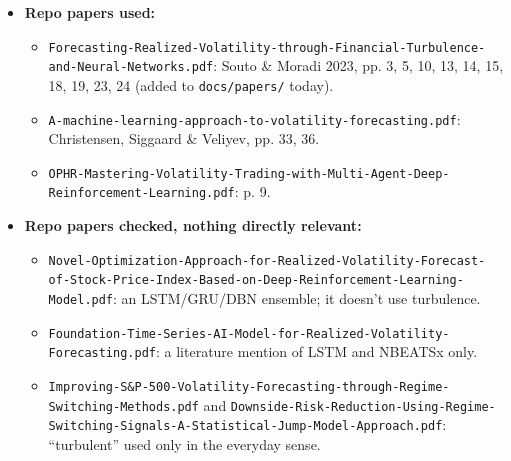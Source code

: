 \documentclass{article}
\begin{document}
\begin{itemize}

\item \textbf{Repo papers used:}

\begin{itemize}

\item \texttt{Forecasting-\allowbreak{}Realized-\allowbreak{}Volatility-\allowbreak{}through-\allowbreak{}Financial-\allowbreak{}Turbulence-\allowbreak{}and-\allowbreak{}Neural-\allowbreak{}Networks.\allowbreak{}pdf}: Souto \& Moradi 2023, pp. 3, 5, 10, 13, 14, 15, 18, 19, 23, 24 (added to \texttt{docs/\allowbreak{}papers/\allowbreak{}} today).

\item \texttt{A-\allowbreak{}machine-\allowbreak{}learning-\allowbreak{}approach-\allowbreak{}to-\allowbreak{}volatility-\allowbreak{}forecasting.\allowbreak{}pdf}: Christensen, Siggaard \& Veliyev, pp. 33, 36.

\item \texttt{OPHR-\allowbreak{}Mastering-\allowbreak{}Volatility-\allowbreak{}Trading-\allowbreak{}with-\allowbreak{}Multi-\allowbreak{}Agent-\allowbreak{}Deep-\allowbreak{}Reinforcement-\allowbreak{}Learning.\allowbreak{}pdf}: p. 9.

\end{itemize}

\item \textbf{Repo papers checked, nothing directly relevant:}

\begin{itemize}

\item \texttt{Novel-\allowbreak{}Optimization-\allowbreak{}Approach-\allowbreak{}for-\allowbreak{}Realized-\allowbreak{}Volatility-\allowbreak{}Forecast-\allowbreak{}of-\allowbreak{}Stock-\allowbreak{}Price-\allowbreak{}Index-\allowbreak{}Based-\allowbreak{}on-\allowbreak{}Deep-\allowbreak{}Reinforcement-\allowbreak{}Learning-\allowbreak{}Model.\allowbreak{}pdf}: an LSTM/\allowbreak{}GRU/\allowbreak{}DBN ensemble; it doesn't use turbulence.

\item \texttt{Foundation-\allowbreak{}Time-\allowbreak{}Series-\allowbreak{}AI-\allowbreak{}Model-\allowbreak{}for-\allowbreak{}Realized-\allowbreak{}Volatility-\allowbreak{}Forecasting.\allowbreak{}pdf}: a literature mention of LSTM and NBEATSx only.

\item \texttt{Improving-\allowbreak{}S\&P-\allowbreak{}500-\allowbreak{}Volatility-\allowbreak{}Forecasting-\allowbreak{}through-\allowbreak{}Regime-\allowbreak{}Switching-\allowbreak{}Methods.\allowbreak{}pdf} and \texttt{Downside-\allowbreak{}Risk-\allowbreak{}Reduction-\allowbreak{}Using-\allowbreak{}Regime-\allowbreak{}Switching-\allowbreak{}Signals-\allowbreak{}A-\allowbreak{}Statistical-\allowbreak{}Jump-\allowbreak{}Model-\allowbreak{}Approach.\allowbreak{}pdf}: ``turbulent'' used only in the everyday sense.


\end{itemize}
\end{itemize}
\end{document}
